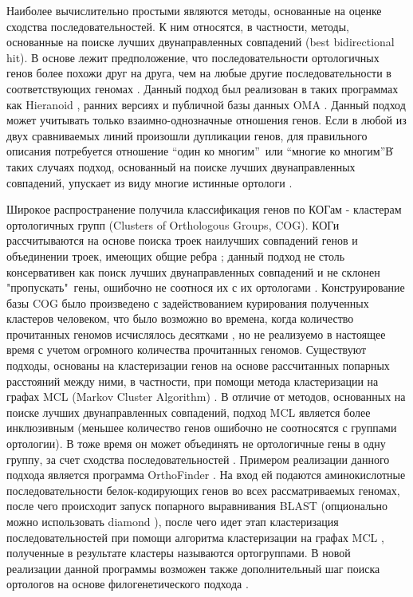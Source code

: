Наиболее вычислительно простыми являются методы, основанные на оценке сходства последовательностей. К ним относятся, в частности, методы, основанные на поиске лучших двунаправленных совпадений (best bidirectional hit). В основе лежит предположение, что последовательности ортологичных генов более похожи друг на друга, чем на любые другие последовательности в соответствующих геномах \cite{wolf2012tight}. Данный подход был реализован в таких программах как Hieranoid \cite{schreiber2013hieranoid}, ранних версиях и  публичной базы данных OMA \cite{roth2008algorithm}. Данный подход может учитывать только взаимно-однозначные отношения генов. Если в любой из двух сравниваемых линий произошли дупликации генов, для правильного описания потребуется отношение “один ко многим”\ или “многие ко многим”\. В таких случаях подход, основанный на поиске лучших двунаправленных совпадений, упускает из виду многие истинные ортологи \cite{gabaldon2008large, dalquen2013bidirectional}. 

Широкое распространение получила классификация генов по КОГам - кластерам ортологичных групп (Clusters of Orthologous Groups, COG). КОГи рассчитываются на основе поиска троек наилучших совпадений генов и объединении троек, имеющих общие ребра \cite{tatusov1997genomic}; данный подход не столь консервативен как поиск лучших двунаправленных совпадений и не склонен "пропускать"\ гены, ошибочно не соотнося их с их ортологами \cite{derelle2020broccoli}. Конструирование базы COG было произведено с задействованием курирования полученных кластеров человеком, что было возможно во времена, когда количество прочитанных геномов исчислялось десятками \cite{tatusov2000cog}, но не реализуемо в настоящее время с учетом огромного количества прочитанных геномов. Существуют подходы, основаны на кластеризации генов на основе рассчитанных попарных расстояний между ними, в частности, при помощи метода кластеризации на графах MCL (Markov Cluster Algorithm) \cite{li2003orthomcl, emms2015orthofinder}. В отличие от методов, основанных на поиске лучших двунаправленных совпадений, подход MCL является более инклюзивным (меньшее количество генов ошибочно не соотносятся с группами ортологии). В тоже время он может объединять не ортологичные гены в одну группу, за счет сходства последовательностей \cite{derelle2020broccoli}. Примером реализации данного подхода является программа OrthoFinder \cite{emms2015orthofinder}. На вход ей подаются аминокислотные последовательности белок-кодирующих генов во всех рассматриваемых геномах, после чего происходит запуск попарного выравнивания BLAST (опционально можно использовать diamond \cite{buchfink2015fast}), после чего идет этап кластеризация последовательностей при помощи алгоритма кластеризации на графах MCL \cite{vandongen2000cluster}, полученные в результате кластеры называются ортогруппами. В новой реализации данной программы возможен также дополнительный шаг поиска ортологов на основе филогенетического подхода \cite{emms2019orthofinder}.


